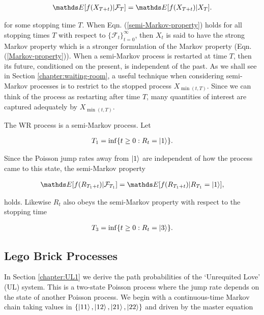 \begin{align}\label{semi-Markov-property}
\bE[f(X_{T+t})\lvert\mathcal{F}_T] =  \bE[f(X_{T+t}) \lvert X_T].
\end{align}

for some stopping time $T$. When Eqn. (\ref{semi-Markov-property}) holds for all stopping times $T$ with respect to $\{\mathcal{F}_t\}_{t=0}^\infty $, then $X_t$ is said to have the strong Markov property \cite{durrett2019probability} which is a stronger formulation of the Markov property (Eqn. (\ref{Markov-property})). When a semi-Markov process is restarted at time $T$, then its future, conditioned on the present, is independent of the past. As we shall see in Section \ref{chapter:waiting-room}, a useful technique when considering semi-Markov processes is to restrict to the stopped process $X_{\min(t,T)}$. Since we can think of the process as restarting after time $T$, many quantities of interest are captured adequately by $X_{\min(t,T)}$. 

The WR process is a semi-Markov process. Let 

\begin{align}
T_1 = \inf \{t \geq 0: R_t = \ket{1}\}.
\end{align}

Since the Poisson jump rates away from $\ket{1}$ are independent of how the process came to this state, the semi-Markov property 

\begin{align}
\bE[f(R_{T_1+t})\lvert\mathcal{F}_{T_1}] =  \bE[f(R_{T_1+t}) \lvert R_{T_1} = \ket{1}],
\end{align}

holds. Likewise $R_t$ also obeys the semi-Markov property with respect to the stopping time 

\begin{align}
T_3 = \inf\{ t \geq 0: R_t = \ket{3}\}.  
\end{align}

\subsection{Lego Brick Processes}
 In Section \ref{chapter:UL1} we derive the path probabilities of the `Unrequited Love' (UL) system. This is a two-state Poisson process where the jump rate depends on the state of another Poisson process. We begin with a continuous-time Markov chain taking values in   $\{\ket{11},\ket{12},\ket{21},\ket{22}\}$ and driven by the master equation
 
